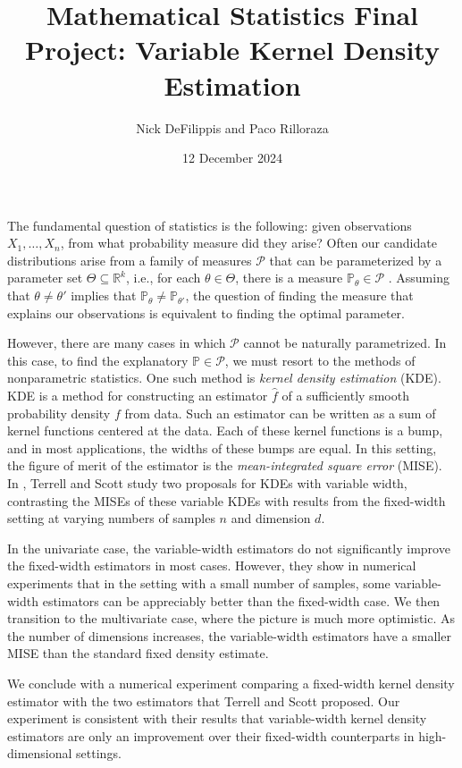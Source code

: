 \documentclass{article}
\title{Mathematical Statistics Final Project: Variable Kernel Density Estimation}
\author{Nick DeFilippis and Paco Rilloraza}
\date{12 December 2024}
\newcommand{\R}{\mathbb{R}}
\begin{document}
\maketitle

The fundamental question of statistics is the following: given observations $X_1, \dots, X_n$, from what probability measure did they arise? Often our candidate distributions arise from a family of measures $\mathcal{P}$ that can be parameterized by a parameter set $\Theta \subseteq \R^k$, i.e., for each $\theta \in \Theta$, there is a measure $\mathbb{P}_\theta \in \mathcal{P}$ \cite{jnw}. Assuming that $\theta \neq \theta'$ implies that $\mathbb{P}_\theta \neq \mathbb{P}_{\theta'}$, the question of finding the measure that explains our observations is equivalent to finding the optimal parameter. 

However, there are many cases in which $\mathcal{P}$ cannot be naturally parametrized. In this case, to find the explanatory $\mathbb{P} \in \mathcal{P}$, we must resort to the methods of nonparametric statistics. One such method is \textit{kernel density estimation} (KDE). KDE is a method for constructing an estimator $\hat{f}$ of a sufficiently smooth probability density $f$ from data. Such an estimator can be written as a sum of kernel functions centered at the data. Each of these kernel functions is a bump, and in most applications, the widths of these bumps are equal. In this setting, the figure of merit of the estimator is the \textit{mean-integrated square error} (MISE). In \cite{vkde}, Terrell and Scott study two proposals for KDEs with variable width, contrasting the MISEs of these variable KDEs with results from the fixed-width setting at varying numbers of samples $n$ and dimension $d$. 

In the univariate case, the variable-width estimators do not significantly improve the fixed-width estimators in most cases. However, they show in numerical experiments that in the setting with a small number of samples, some variable-width estimators can be appreciably better than the fixed-width case. We then transition to the multivariate case, where the picture is much more optimistic. As the number of dimensions increases, the variable-width estimators have a smaller MISE than the standard fixed density estimate.

We conclude with a numerical experiment comparing a fixed-width kernel density estimator with the two estimators that Terrell and Scott proposed. Our experiment is consistent with their results that variable-width kernel density estimators are only an improvement over their fixed-width counterparts in high-dimensional settings.
\end{document}
